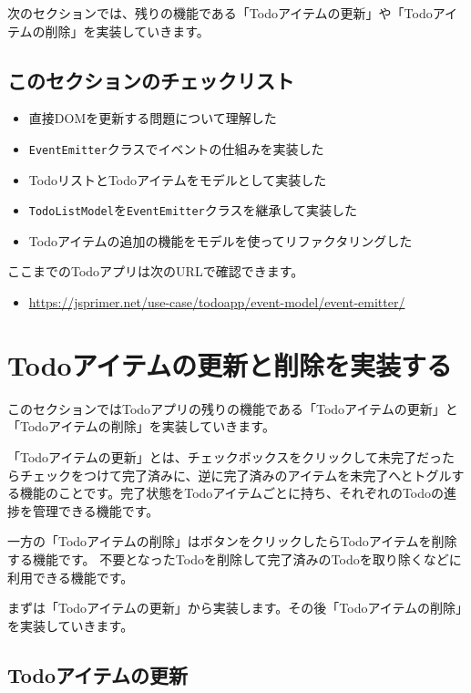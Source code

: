 次のセクションでは、残りの機能である「Todoアイテムの更新」や「Todoアイテムの削除」を実装していきます。

\hypertarget{section-checklist}{%
\subsection{このセクションのチェックリスト}\label{section-checklist}}

\begin{itemize}
\item
  直接DOMを更新する問題について理解した
\item
  \texttt{EventEmitter}クラスでイベントの仕組みを実装した
\item
  TodoリストとTodoアイテムをモデルとして実装した
\item
  \texttt{TodoListModel}を\texttt{EventEmitter}クラスを継承して実装した
\item
  Todoアイテムの追加の機能をモデルを使ってリファクタリングした
\end{itemize}

ここまでのTodoアプリは次のURLで確認できます。

\begin{itemize}
\item
  \url{https://jsprimer.net/use-case/todoapp/event-model/event-emitter/}
\end{itemize}

\hypertarget{todo-item-update-and-delete}{%
\section{Todoアイテムの更新と削除を実装する}\label{todo-item-update-and-delete}}

このセクションではTodoアプリの残りの機能である「Todoアイテムの更新」と「Todoアイテムの削除」を実装していきます。

「Todoアイテムの更新」とは、チェックボックスをクリックして未完了だったらチェックをつけて完了済みに、逆に完了済みのアイテムを未完了へとトグルする機能のことです。完了状態をTodoアイテムごとに持ち、それぞれのTodoの進捗を管理できる機能です。

一方の「Todoアイテムの削除」はボタンをクリックしたらTodoアイテムを削除する機能です。
不要となったTodoを削除して完了済みのTodoを取り除くなどに利用できる機能です。

まずは「Todoアイテムの更新」から実装します。その後「Todoアイテムの削除」を実装していきます。

\hypertarget{todo-item-update}{%
\subsection{Todoアイテムの更新}\label{todo-item-update}}

